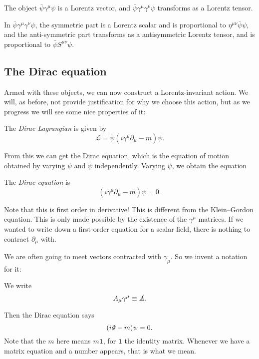 \documentclass[a4paper]{article}
\begin{document}
\begin{cor}
  The object $\bar{\psi} \gamma^\mu \psi$ is a Lorentz vector, and $\bar\psi \gamma^\mu \gamma^\nu \psi$ transforms as a Lorentz tensor.
\end{cor}

In $\bar\psi \gamma^\mu \gamma^\nu \psi$, the symmetric part is a Lorentz scalar and is proportional to $\eta^{\mu\nu} \bar\psi \psi$, and the anti-symmetric part transforms as a antisymmetric Lorentz tensor, and is proportional to $\bar\psi S^{\mu\nu} \psi$.

\subsection{The Dirac equation}
Armed with these objects, we can now construct a Lorentz-invariant action. We will, as before, not provide justification for why we choose this action, but as we progress we will see some nice properties of it:
\begin{defi}
  The \emph{Dirac Lagrangian} is given by
  \[
    \mathcal{L} = \bar\psi (i \gamma^\mu \partial_\mu - m)\psi.
  \]
\end{defi}
From this we can get the Dirac equation, which is the equation of motion obtained by varying $\psi$ and $\bar\psi$ independently. Varying $\bar\psi$, we obtain the equation
\begin{defi}
  The \emph{Dirac equation} is
  \[
    (i \gamma^\mu \partial_\mu - m)\psi = 0.
  \]
\end{defi}
Note that this is first order in derivative! This is different from the Klein--Gordon equation. This is only made possible by the existence of the $\gamma^\mu$ matrices. If we wanted to write down a first-order equation for a scalar field, there is nothing to contract $\partial_\mu$ with.

We are often going to meet vectors contracted with $\gamma_\mu$. So we invent a notation for it:
\begin{notation}\index{$\slashed\psi$}
  We write
  \[
    A_\mu \gamma^\mu \equiv \slashed A.
  \]
\end{notation}
Then the Dirac equation says
\[
  (i \slashed\partial - m) \psi = 0.
\]
Note that the $m$ here means $m\mathbf{1}$, for $\mathbf{1}$ the identity matrix. Whenever we have a matrix equation and a number appears, that is what we mean.
\end{document}
